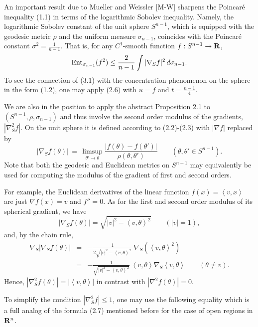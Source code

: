\documentclass[reqno,12pt]{amsart}
\theoremstyle{plain}
\begin{document}
\vskip2mm
\noindent
An important result due to Mueller and Weissler [M-W] sharpens the 
Poincar\'e inequality (1.1) in terms of the logarithmic Sobolev inequality. 
Namely, the logarithmic Sobolev constant of the unit sphere 
$S^{n-1}$, which is equipped with the geodesic metric $\rho$ and 
the uniform measure $\sigma_{n-1}$, coincides with 
the Poincar\'e constant $\sigma^2 = \frac{1}{n-1}$.
That is, for any $C^1$-smooth function $f:S^{n-1} \rightarrow {{\bf R}}$,
\begin{equation}
{{\rm Ent}}_{\sigma_{n-1}}(f^2) \leq \frac{2}{n-1} \int |\nabla_S f|^2\,d\sigma_{n-1}.
\end{equation} 
To see the connection of (3.1) with the concentration phenomenon on the 
sphere in the form (1.2), one may apply (2.6) with $u=f$ and $t = \frac{n-1}{4}$. 

We are also in the position to apply the abstract Proposition 2.1 to 
$(S^{n-1},\rho,\sigma_{n-1})$ and thus involve the second order modulus 
of the gradients, $|\nabla_S^2 f|$. On the unit sphere it is defined according 
to (2.2)-(2.3) with $|\nabla f|$ replaced by
$$
|\nabla_S f(\theta)| 
 \, = \, \limsup_{\theta' \rightarrow \theta} \frac{|f(\theta)-f(\theta')|}{\rho(\theta,\theta')} \qquad 
(\theta, \theta' \in S^{n-1}).
$$
Note that both the geodesic and Euclidean metrics on $S^{n-1}$ may 
equivalently be used for computing the modulus of the gradient of first
and second orders.

For example, the Euclidean derivatives of the linear function 
$f(x) = \left<v,x\right>$ are just $\nabla f(x) = v$ and $f'' = 0$. 
As for the first and second order modulus of its spherical gradient, 
we have
$$
|\nabla_S f(\theta)| = \sqrt{|v|^2 - \left<v,\theta\right>^2} \qquad
(|v|=1),
$$
and, by the chain rule,
\begin{eqnarray*}
\nabla_S |\nabla_S f(\theta)| 
 & = &
-\frac{1}{2\sqrt{|v|^2 - \left<v,\theta\right>^2}}\
\nabla_S \left(\left<v,\theta\right>^2\right) \\
 & = &
-\frac{1}{\sqrt{|v|^2 - \left<v,\theta\right>^2}}\
\left<v,\theta\right> \nabla_S \left<v,\theta\right> \qquad
(\theta \neq v).
\end{eqnarray*}
Hence, $|\nabla_S^2 f(\theta)| = |\left<v,\theta\right>|$
in contrast with $|\nabla^2 f(\theta)| = 0$.

\vskip2mm
To simplify the condition $|\nabla_S^2 f| \leq 1$, one may use the 
following equality which is a full analog of the formula (2.7) mentioned 
before for the case of open regions in ${{\bf R}}^n$.
\end{document}
